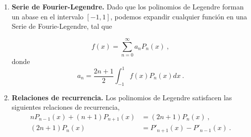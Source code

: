 \begin{propiedad}
\begin{enumerate}
        \item \textbf{Serie de Fourier-Legendre.} Dado que los polinomios de Legendre forman un abase en el intervalo $[-1,1]$, podemos expandir cualquier función en una Serie de Fourie-Legendre, tal que
    
        \begin{equation}
            f(x) = \sum_{n=0}^\infty a_n P_n(x) \ ,
        \end{equation}
        donde 
        \begin{equation}
            a_n = \frac{2n+1}{2} \int_{-1}^1 f(x) P_n(x) dx \ .
        \end{equation}
         
        \item \textbf{Relaciones de recurrencia.} Los polinomios de Legendre satisfacen las siguientes relaciones de recurrencia,
        \begin{align}
            n P_{n-1}(x) + (n+1) P_{n+1}(x) & = (2n+1) P_n(x) \ , \\
            (2n+1) P_n(x) & = P'_{n+1}(x) - P'_{n-1}(x) \ .
        \end{align}    
    \end{enumerate}
\end{propiedad}

